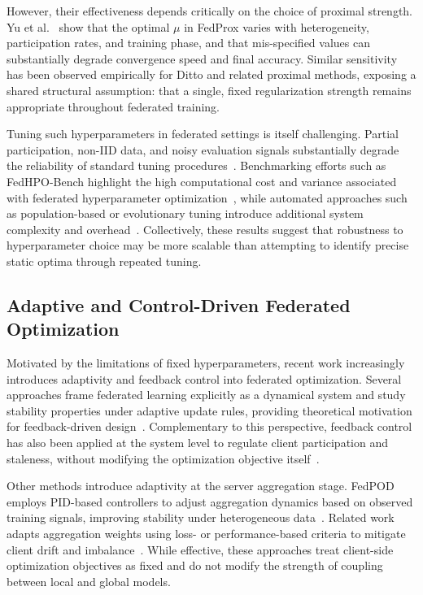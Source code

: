 \documentclass[letterpaper]{article} %
\begin{document}
However, their effectiveness depends critically on the choice of proximal strength. Yu et al.~\cite{yu2024effect} show that the optimal $\mu$ in FedProx varies with heterogeneity, participation rates, and training phase, and that mis-specified values can substantially degrade convergence speed and final accuracy. Similar sensitivity has been observed empirically for Ditto and related proximal methods, exposing a shared structural assumption: that a single, fixed regularization strength remains appropriate throughout federated training.

Tuning such hyperparameters in federated settings is itself challenging. Partial participation, non-IID data, and noisy evaluation signals substantially degrade the reliability of standard tuning procedures~\cite{kuo2023noisy}. Benchmarking efforts such as FedHPO-Bench highlight the high computational cost and variance associated with federated hyperparameter optimization~\cite{wang2023fedhpo}, while automated approaches such as population-based or evolutionary tuning introduce additional system complexity and overhead~\cite{guo2022auto}. Collectively, these results suggest that robustness to hyperparameter choice may be more scalable than attempting to identify precise static optima through repeated tuning.

\subsection{Adaptive and Control-Driven Federated Optimization}

Motivated by the limitations of fixed hyperparameters, recent work increasingly introduces adaptivity and feedback control into federated optimization. Several approaches frame federated learning explicitly as a dynamical system and study stability properties under adaptive update rules, providing theoretical motivation for feedback-driven design~\cite{agarwal2025adaptive}. Complementary to this perspective, feedback control has also been applied at the system level to regulate client participation and staleness, without modifying the optimization objective itself~\cite{cummins2024controlling}.

Other methods introduce adaptivity at the server aggregation stage. FedPOD employs PID-based controllers to adjust aggregation dynamics based on observed training signals, improving stability under heterogeneous data~\cite{kim2025fedpod}. Related work adapts aggregation weights using loss- or performance-based criteria to mitigate client drift and imbalance~\cite{zeng2025power}. While effective, these approaches treat client-side optimization objectives as fixed and do not modify the strength of coupling between local and global models.
\end{document}
